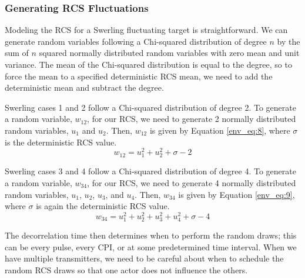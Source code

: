 \subsubsection{Generating RCS Fluctuations}
Modeling the RCS for a Swerling fluctuating target is straightforward. We can generate random variables following a Chi-squared distribution of degree $n$ by the sum of $n$ squared normally distributed random variables with zero mean and unit variance. The mean of the Chi-squared distribution is equal to the degree, so to force the mean to a specified deterministic RCS mean, we need to add the deterministic mean and subtract the degree.

Swerling cases 1 and 2 follow a Chi-squared distribution of degree 2. To generate a random variable, $w_{12}$, for our RCS, we need to generate 2 normally distributed random variables, $u_1$ and $u_2$. Then, $w_{12}$ is given by Equation \ref{env_eq:8}, where $\sigma$ is the deterministic RCS value.
\begin{equation}
  \label{env_eq:8}
w_{12} = u_1^2 + u_2^2 + \sigma - 2
  \end{equation}

Swerling cases 3 and 4 follow a Chi-squared distribution of degree 4. To generate a random variable, $w_{34}$, for our RCS, we need to generate 4 normally distributed random variables, $u_1$, $u_2$, $u_3$, and $u_4$. Then, $w_{34}$ is given by Equation \ref{env_eq:9}, where $\sigma$ is again the deterministic RCS value.
\begin{equation}
  \label{env_eq:9}
w_{34} = u_1^2 + u_2^2 + u_3^2 + u_4^2 + \sigma - 4
  \end{equation}
  
The decorrelation time then determines when to perform the random draws; this can be every pulse, every CPI, or at some predetermined time interval. When we have multiple transmitters, we need to be careful about when to schedule the random RCS draws so that one actor does not influence the others.  